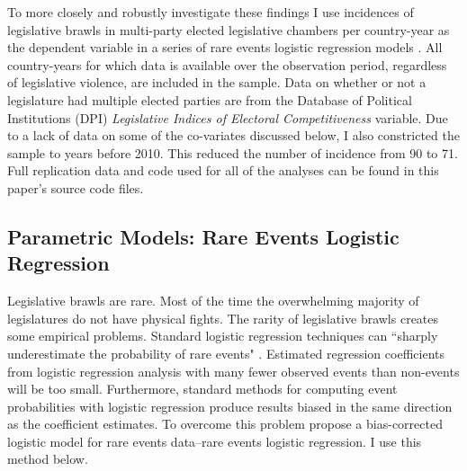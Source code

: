 \documentclass[a4paper]{article}\usepackage[]{graphicx}\usepackage[]{color}
\begin{document}
To more closely and robustly investigate these findings I use incidences of legislative brawls in multi-party elected legislative chambers per country-year as the dependent variable in a series of rare events logistic regression models \citep{KingRareEvents2001, KingRareEventsPA2001}. All country-years for which data is available over the observation period, regardless of legislative violence, are included in the sample. Data on whether or not a legislature had multiple elected parties are from the Database of Political Institutions (DPI) \citep[updated to 2010]{DPI2001} {\emph{Legislative Indices of Electoral Competitiveness}} variable. Due to a lack of data on some of the co-variates discussed below, I also constricted the sample to years before 2010. This reduced the number of incidence from 90 to 71. Full replication data and code used for all of the analyses can be found in this paper's source code files.

\subsection{Parametric Models: Rare Events Logistic Regression}

Legislative brawls are rare. Most of the time the overwhelming majority of legislatures do not have physical fights. The rarity of legislative brawls creates some empirical problems. Standard logistic regression techniques can ``sharply underestimate the probability of rare events" \cite[137]{KingRareEventsPA2001}. Estimated regression coefficients from logistic regression analysis with many fewer observed events than non-events will be too small. Furthermore, standard methods for computing event probabilities with logistic regression produce results biased in the same direction as the coefficient estimates. To overcome this problem \cite{KingRareEvents2001,KingRareEventsPA2001} propose a bias-corrected logistic model for rare events data--rare events logistic regression. I use this method below.
\end{document}
